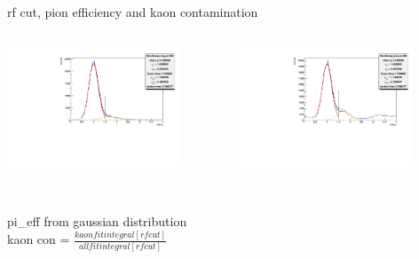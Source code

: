 \documentclass[aspectratio=169,xcolor=dvipsnames]{beamer}
\begin{document}
\begin{frame}{rf cut, pion efficiency and kaon contamination}
  \begin{columns}
    \begin{column}[T]{0.5\textwidth}
  \includegraphics[width = 0.8\textwidth]{results/pid/rftime/rftime_neg_280_pi.pdf}
\end{column}
\begin{column}[T]{0.5\textwidth}
  \includegraphics[width = 0.8\textwidth]{results/pid/rftime/rftime_pos_280_pi.pdf}
\end{column}
\end{columns}
\\
pi\_eff from gaussian distribution
\\
kaon con = $\frac{kaon fit integral[rfcut]}{all fit integral [rfcut]}$
\end{frame}
\end{document}
